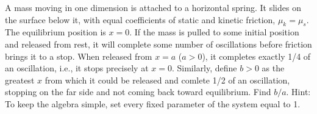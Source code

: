 A mass moving in one dimension is attached to a horizontal spring. It
slides on the surface below it, with equal coefficients of static
and kinetic friction, $\mu_k=\mu_s$.
The equilibrium position is $x=0$. If the mass is pulled to some initial
position and released from rest, it will complete some number of oscillations
before friction brings it to a stop. When released from
$x=a$ ($a>0$), it completes exactly 1/4 of an oscillation, i.e., it
stops precisely at $x=0$. Similarly, define $b>0$ as the greatest $x$
from which it could be released and comlete 1/2 of an oscillation, stopping
on the far side and not coming back toward equilibrium.
Find $b/a$. Hint: To keep the algebra simple, set every fixed parameter
of the system equal to 1.\answercheck
